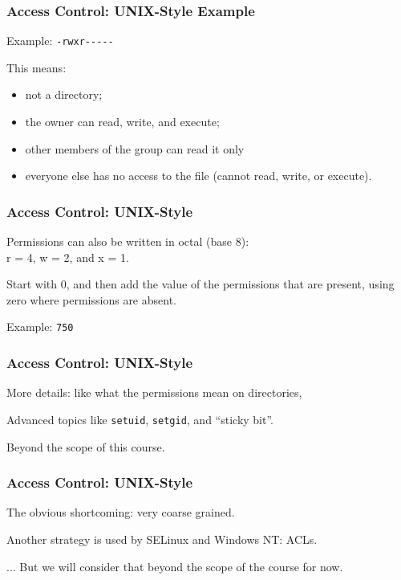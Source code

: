\begin{frame}
\frametitle{Access Control: UNIX-Style Example}


Example: \texttt{-rwxr{-}{-}{-}{-}{-}} 

This means:
\begin{itemize}
\item not a directory; 
\item the owner can read, write, and execute; 
\item other members of the group can read it only
\item everyone else has no access to the file (cannot read, write, or execute).
\end{itemize}


\end{frame}

\begin{frame}
\frametitle{Access Control: UNIX-Style}


Permissions can also be written in octal (base 8): \\
\quad r = 4, w = 2, and x = 1. 

Start with 0, and then add the value of the  permissions that are present, using zero where permissions are absent. 

Example: \texttt{750} 


\end{frame}

\begin{frame}
\frametitle{Access Control: UNIX-Style}


More details: like what the permissions mean on directories, 

Advanced topics like \texttt{setuid}, \texttt{setgid}, and ``sticky bit''.

Beyond the scope of this course.


\end{frame}

\begin{frame}
\frametitle{Access Control: UNIX-Style}


The obvious shortcoming: very coarse grained.

Another strategy is used by SELinux and Windows NT: ACLs.

... But we will consider that beyond the scope of the course for now.
\end{frame}



